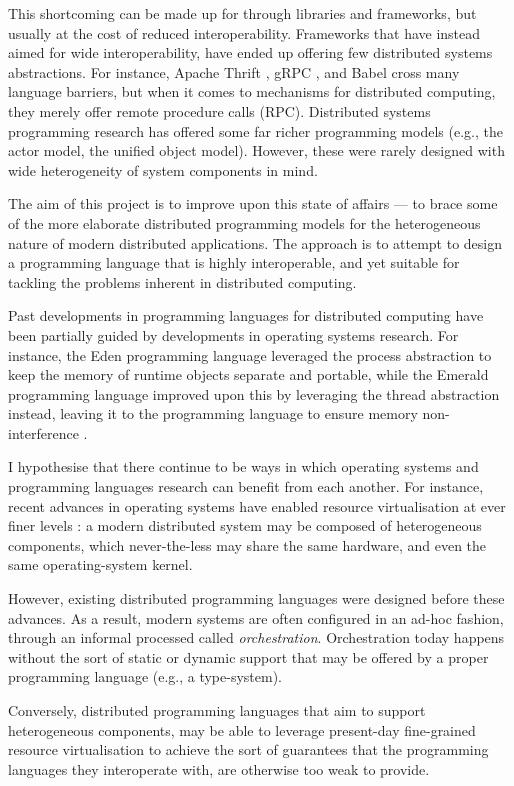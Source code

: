 This shortcoming can be made up for through libraries and frameworks,
but usually at the cost of reduced interoperability. Frameworks that
have instead aimed for wide interoperability, have ended up offering
few distributed systems abstractions. For instance, Apache Thrift
\cite{slee2007thrift}, gRPC \cite{grpc2018}, and Babel
\cite{epperly2012high} cross many language barriers, but when it comes
to mechanisms for distributed computing, they merely offer remote
procedure calls (RPC). Distributed systems programming research has
offered some far richer programming models (e.g., the actor model, the
unified object model). However, these were rarely designed with wide
heterogeneity of system components in mind.

\medskip

The aim of this project is to improve upon this state of affairs ---
to brace some of the more elaborate distributed programming models for
the heterogeneous nature of modern distributed applications. The
approach is to attempt to design a programming language that is highly
interoperable, and yet suitable for tackling the problems inherent in
distributed computing.

Past developments in programming languages for distributed computing
have been partially guided by developments in operating systems
research. For instance, the Eden \cite{almes1985eden} programming
language leveraged the process abstraction to keep the memory of
runtime objects separate and portable, while the Emerald programming
language improved upon this by leveraging the thread abstraction
instead, leaving it to the programming language to ensure memory
non-interference \cite{black2007development}.

I hypothesise that there continue to be ways in which operating
systems and programming languages research can benefit from each
another. For instance, recent advances in operating systems have
enabled resource virtualisation at ever finer levels
\cite{felter2015updated}: a modern distributed system
\cite{burns2016design} may be composed of heterogeneous components,
which never-the-less may share the same hardware, and even the same
operating-system kernel.

However, existing distributed programming languages were designed
before these advances. As a result, modern systems are often
configured in an ad-hoc fashion, through an informal processed called
\emph{orchestration}. Orchestration today happens without the sort of
static or dynamic support that may be offered by a proper programming
language (e.g., a type-system).

Conversely, distributed programming languages that aim to support
heterogeneous components, may be able to leverage present-day
fine-grained resource virtualisation to achieve the sort of guarantees
that the programming languages they interoperate with, are otherwise
too weak to provide.

